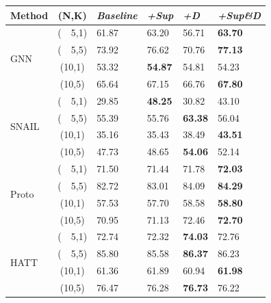 \begin{table}[ht]
\centering
\scriptsize
\begin{tabular}{|l|c|p{25pt}<{\centering}|p{25pt}<{\centering}|p{25pt}<{\centering}|p{25pt}<{\centering}|}
\hline
\textbf{Method} & \textbf{(N,K)}& \emph{Baseline} & \emph{+Sup} & \emph{+D} &\emph{+Sup\&D} \\ \hline

\multirow{4}{*}{GNN} & (~~5,1) &61.87&63.20&56.71&\textbf{63.70}\\
& (~~5,5) &73.92&76.62&70.76&\textbf{77.13} \\
& (10,1) &53.32&\textbf{54.87}&54.81&54.23\\
& (10,5) &65.64&67.15&66.76&\textbf{67.80} \\ \hline

\multirow{4}{*}{SNAIL} & (~~5,1) &29.85&\textbf{48.25}&30.82&43.10\\
& (~~5,5) &55.39&55.76&\textbf{63.38}&56.04 \\
& (10,1) &35.16&35.43&38.49&\textbf{43.51}\\
& (10,5) &47.73&48.65&\textbf{54.06}&52.14 \\ \hline

\multirow{4}{*}{Proto} & (~~5,1) &71.50&71.44&71.78&\textbf{72.03}\\
& (~~5,5) &82.72&83.01&84.09&\textbf{84.29}\\
& (10,1) &57.53&57.70&58.58&\textbf{58.80}\\
& (10,5) &70.95&71.13&72.46&\textbf{72.70} \\ \hline

\multirow{4}{*}{HATT} & (~~5,1) &72.74&72.32&\textbf{74.03}&72.76\\
& (~~5,5) &85.80&85.58&\textbf{86.37}&86.23 \\
& (10,1) &61.36&61.89&60.94&\textbf{61.98}\\
& (10,5) &76.47&76.28&\textbf{76.73}&76.22 \\ \hline


\end{tabular}
\end{table}

